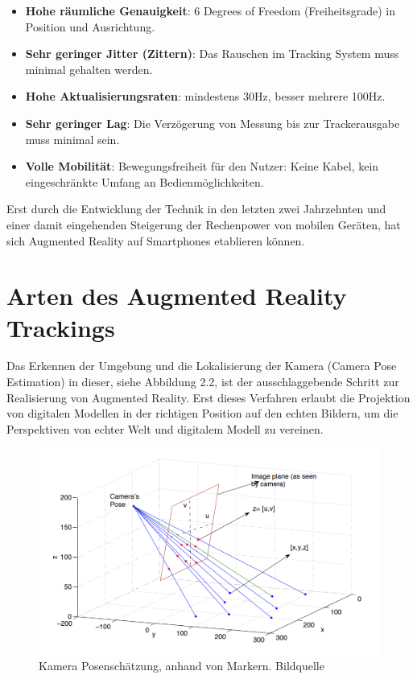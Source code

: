 \begin{itemize}

\item \textbf{Hohe räumliche Genauigkeit}: 6 \glqq Degrees of Freedom\grqq{} (Freiheitsgrade) in Position und Ausrichtung. 

\item \textbf{Sehr geringer Jitter (Zittern)}: Das Rauschen im Tracking System muss minimal gehalten werden.

\item \textbf{Hohe Aktualisierungsraten}: mindestens 30Hz, besser mehrere 100Hz.

\item \textbf{Sehr geringer Lag}: Die Verzögerung von Messung bis zur Trackerausgabe muss minimal sein.

\item \textbf{Volle Mobilität}: Bewegungsfreiheit für den Nutzer: Keine Kabel, kein eingeschränkte Umfang an Bedienmöglichkeiten.
\end{itemize}

Erst durch die Entwicklung der Technik in den letzten zwei Jahrzehnten und einer damit eingehenden Steigerung der Rechenpower von mobilen Geräten, hat sich Augmented Reality auf Smartphones etablieren können.

\section{Arten des Augmented Reality Trackings}

Das Erkennen der Umgebung und die Lokalisierung der Kamera (Camera Pose Estimation) in dieser, siehe Abbildung 2.2, ist der ausschlaggebende Schritt zur Realisierung von Augmented Reality. Erst dieses Verfahren erlaubt die Projektion von digitalen Modellen in der richtigen Position auf den echten Bildern, um die Perspektiven von echter Welt und digitalem Modell zu vereinen. 


\begin{figure}[H]
	\centering
	\includegraphics[scale=0.58]{pose.png}
	\caption{Kamera Posenschätzung, anhand von Markern. Bildquelle \cite{pose}}
\end{figure} 

